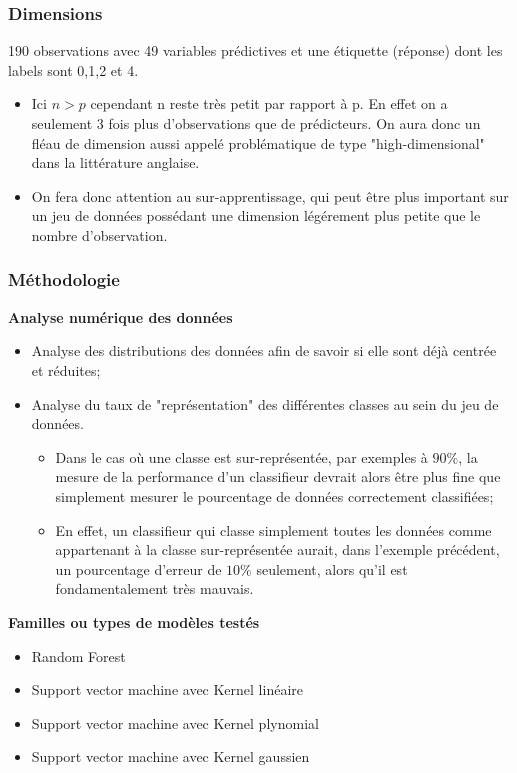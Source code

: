 \documentclass{article}
\begin{document}
\subsubsection{Dimensions} 190 observations avec 49 variables prédictives et une étiquette (réponse) dont les labels sont 0,1,2 et 4.
\begin{itemize}
    \item Ici $n>p$ cependant n reste très petit par rapport à p. En effet on a seulement 3 fois plus d'observations que de prédicteurs. On aura donc un fléau de dimension aussi appelé problématique de type "high-dimensional" dans la littérature anglaise.
    \item On fera donc attention au sur-apprentissage, qui peut être plus important sur un jeu de données possédant une dimension légérement plus petite que le nombre d'observation.
\end{itemize}

\subsubsection{Méthodologie}

\textbf{Analyse numérique des données}\\
\begin{itemize}
    \item Analyse des distributions des données afin de savoir si elle sont déjà centrée et réduites;
    \item Analyse du taux de "représentation" des différentes classes au sein du jeu de données.
    \begin{itemize}
        \item Dans le cas où une classe est sur-représentée, par exemples à $90\%$, la mesure de la performance d'un classifieur devrait alors être plus fine que simplement mesurer le pourcentage de données correctement classifiées;
        \item En effet, un classifieur qui classe simplement toutes les données comme appartenant à la classe sur-représentée aurait, dans l'exemple précédent, un pourcentage d'erreur de $10\%$ seulement, alors qu'il est fondamentalement très mauvais.\\
    \end{itemize}
\end{itemize}

\textbf{Familles ou types de modèles testés}\\
\begin{itemize}
    \item Random Forest
    \item Support vector machine avec Kernel linéaire
    \item Support vector machine avec Kernel plynomial
    \item Support vector machine avec Kernel gaussien\\
\end{itemize}
\end{document}
